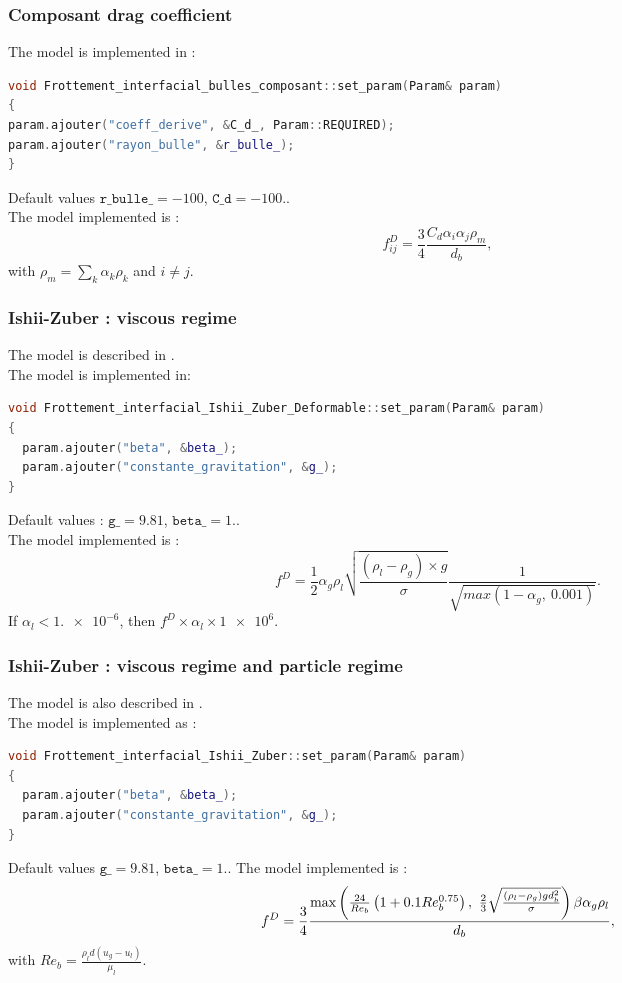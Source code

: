 \subsubsection{Composant drag coefficient}
The model is implemented in :
\begin{lstlisting}[language=c++]
void Frottement_interfacial_bulles_composant::set_param(Param& param)
{
param.ajouter("coeff_derive", &C_d_, Param::REQUIRED);
param.ajouter("rayon_bulle", &r_bulle_);
}
\end{lstlisting}
Default values $\texttt{r\_bulle\_}=-100$, $\texttt{C\_d}=-100.$.\\
The model implemented is :
\begin{equation}
   f^{D}_{ij}=\frac{3}{4}\frac{C_d\alpha_i\alpha_j\rho_m}{d_b},
\end{equation}
with $\rho_m=\sum_k \alpha_k \rho_k$ and $i \neq j$.
\subsubsection{Ishii-Zuber : viscous regime}
The model is described in \cite{IshiiZuber}.\\
The model is implemented in:
\begin{lstlisting}[language=c++]
void Frottement_interfacial_Ishii_Zuber_Deformable::set_param(Param& param)
{
  param.ajouter("beta", &beta_);
  param.ajouter("constante_gravitation", &g_);
}
\end{lstlisting}
Default values : $\texttt{g\_}=9.81$, $\texttt{beta\_}=1.$.\\
The model implemented is :
\begin{equation}
   f^{D}=\frac{1}{2}\alpha_g\rho_l\sqrt{\frac{\left(\rho_l-\rho_g\right)\times{}g}{\sigma}}\frac{1}{\sqrt{max\left(1-\alpha_g,\ 0.001\right)}}.
\end{equation}
If $\alpha_l < \num{1.e-6}$, then $f^D\times{}\alpha_l\times{}\num{1e6}$.

\subsubsection{Ishii-Zuber : viscous regime and particle regime}
The model is also described in \cite{IshiiZuber}.\\
The model is implemented as :
\begin{lstlisting}[language=c++]
void Frottement_interfacial_Ishii_Zuber::set_param(Param& param)
{
  param.ajouter("beta", &beta_);
  param.ajouter("constante_gravitation", &g_);
}
\end{lstlisting}
Default values $\texttt{g\_}=9.81$, $\texttt{beta\_}=1.$.
The model implemented is :
\begin{equation}
   f^{D}=\frac{3}{4}\frac{\text{max}\parent{\frac{24}{Re_b}\left(1+0.1Re_b^{0.75}\right),\ \frac{2}{3}\sqrt{\frac{\left(\rho_l-\rho_g\right)g d_b^2}{\sigma}}}\beta \alpha_g\rho_l}{d_b },
\end{equation}
with $Re_b=\frac{\rho_l d (u_g-u_l)}{\mu_l}$.
